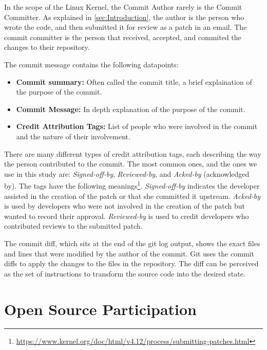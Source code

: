 In the scope of the Linux Kernel, the Commit Author rarely is the Commit Committer. As explained in \autoref{sec:Introduction}, the author is the person who wrote the code, and then submitted it for review as a patch in an email. The commit committer is the person that received, accepted, and commited the changes to their repository.

The commit message contains the following datapoints:

\begin{itemize}
	\item \textbf{Commit summary:} Often called the commit title, a brief explaination of the purpose of the commit. 
	\item \textbf{Commit Message:} In depth explanation of the purpose of the commit.
	\item \textbf{Credit Attribution Tags:} List of people who were involved in the commit and the nature of their involvement. 
\end{itemize}

There are many different types of credit attribution tags, each describing the way the person contributed to the commit. The most common ones, and the ones we use in this study are: \textit{Signed-off-by}, \textit{Reviewed-by}, and \textit{Acked-by} (acknowledged by). The tags have the following meanings\footnote{\url{https://www.kernel.org/doc/html/v4.12/process/submitting-patches.html}}. \textit{Signed-off-by} indicates the developer assisted in the creation of the patch or that she committed it upstream. \textit{Acked-by} is used by developers who were not involved in the creation of the patch but wanted to record their approval. \textit{Reviewed-by} is used to credit developers who contributed reviews to the submitted patch. 

The commit diff, which sits at the end of the git log output, shows the exact files and lines that were modified by the author of the commit. Git uses the commit diffs to apply the changes to the files in the repository. The diff can be perceived as the set of instructions to transform the source code into the desired state.



\section{Open Source Participation}


